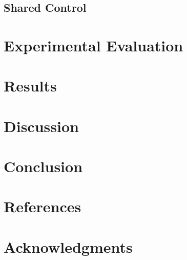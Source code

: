 \documentclass[conference]{IEEEtran}
\begin{document}
\subsection{Shared Control}

\section{Experimental Evaluation}

\section{Results}
\section{Discussion}
\section{Conclusion}
\section{References}



\section*{Acknowledgments}




\end{document}
